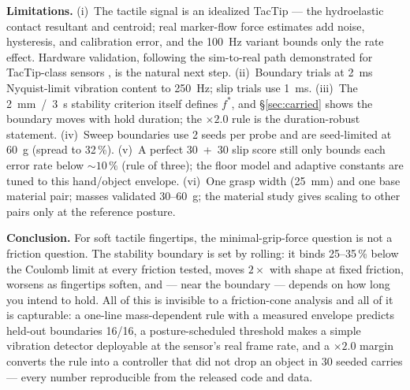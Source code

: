 \documentclass[journal]{IEEEtran}
\newcommand{\fstar}{f^{*}}
\begin{document}
\textbf{Limitations.} (i)~The tactile signal is an idealized TacTip --- the
hydroelastic contact resultant and centroid; real marker-flow force
estimates add noise, hysteresis, and calibration error, and the 100~Hz
variant bounds only the rate effect. Hardware validation, following the
sim-to-real path demonstrated for TacTip-class sensors
\cite{lin2022tactilegym2}, is the natural next step. (ii)~Boundary trials
at 2~ms Nyquist-limit vibration content to 250~Hz; slip trials use 1~ms.
(iii)~The 2~mm~/~3~s stability criterion itself defines $\fstar$, and
\S\ref{sec:carried} shows the boundary moves with hold duration; the
$\times 2.0$ rule is the duration-robust statement. (iv)~Sweep boundaries
use 2 seeds per probe and are seed-limited at 60~g (spread to 32\,\%).
(v)~A perfect 30~+~30 slip score still only bounds each error rate below
${\sim}10\,\%$ (rule of three); the floor model and adaptive constants are
tuned to this hand/object envelope. (vi)~One grasp width (25~mm) and one
base material pair; masses validated 30--60~g; the material study gives
scaling to other pairs only at the reference posture.

\textbf{Conclusion.} For soft tactile fingertips, the minimal-grip-force
question is not a friction question. The stability boundary is set by
rolling: it binds 25--35\,\% below the Coulomb limit at every friction
tested, moves $2\times$ with shape at fixed friction, worsens as fingertips
soften, and --- near the boundary --- depends on how long you intend to
hold. All of this is invisible to a friction-cone analysis and all of it is
capturable: a one-line mass-dependent rule with a measured envelope
predicts held-out boundaries 16/16, a posture-scheduled threshold makes a
simple vibration detector deployable at the sensor's real frame rate, and a
$\times 2.0$ margin converts the rule into a controller that did not drop
an object in 30 seeded carries --- every number reproducible from the
released code and data.

\balance


\end{document}
